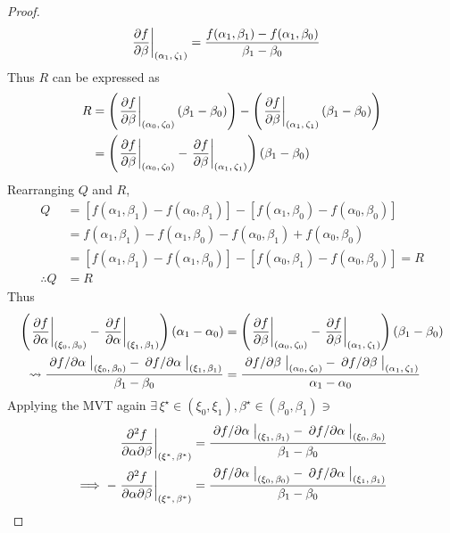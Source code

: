 \begin{lemma}
\begin{proof}
\begin{align*}
			\eval{\pdv{f}{\beta}}_{\point{\alpha_1}{\zeta_1}}&=\frac{f(\alpha_1,\beta_1)-f(\alpha_1,\beta_0)}{\beta_1-\beta_0}
		\end{align*}
		Thus $R$ can be expressed as
		\begin{align*}
			R&=\left(\eval{\pdv{f}{\beta}}_{\point{\alpha_0}{\zeta_0}}\left(\beta_1-\beta_0\right)\right)-\left(\eval{\pdv{f}{\beta}}_{\point{\alpha_1}{\zeta_1}}\left(\beta_1-\beta_0\right)\right)\\
			&=\left(\eval{\pdv{f}{\beta}}_{\point{\alpha_0}{\zeta_0}}-\eval{\pdv{f}{\beta}}_{\point{\alpha_1}{\zeta_1}}\right)\left(\beta_1-\beta_0\right)
		\end{align*}
		Rearranging $Q$ and $R$,
		\begin{align*}
			Q&=[f(\alpha_1,\beta_1)-f(\alpha_0,\beta_1)]-[f(\alpha_1,\beta_0)-f(\alpha_0,\beta_0)]\\
			&=f(\alpha_1,\beta_1)-f(\alpha_1,\beta_0)-f(\alpha_0,\beta_1)+f(\alpha_0,\beta_0)\\
			&=[f(\alpha_1,\beta_1)-f(\alpha_1,\beta_0)]-[f(\alpha_0,\beta_1)-f(\alpha_0,\beta_0)]=R\\
			\therefore Q&=R
		\end{align*}
		Thus
		\begin{align}
			\notag\left(\eval{\pdv{f}{\alpha}}_{\point{\xi_0}{\beta_0}}-\eval{\pdv{f}{\alpha}}_{\point{\xi_1}{\beta_1}}\right)\left(\alpha_1-\alpha_0\right)&=\left(\eval{\pdv{f}{\beta}}_{\point{\alpha_0}{\zeta_0}}-\eval{\pdv{f}{\beta}}_{\point{\alpha_1}{\zeta_1}}\right)\left(\beta_1-\beta_0\right)\\
			\label{proof:SYMMETRY}\leadsto\frac{\eval{\pdv*{f}{\alpha}}_{\point{\xi_0}{\beta_0}}-\eval{\pdv*{f}{\alpha}}_{\point{\xi_1}{\beta_1}}}{\beta_1-\beta_0}&=\frac{\eval{\pdv*{f}{\beta}}_{\point{\alpha_0}{\zeta_0}}-\eval{\pdv*{f}{\beta}}_{\point{\alpha_1}{\zeta_1}}}{\alpha_1-\alpha_0}
		\end{align}
		Applying the MVT again $\exists\,\xi^\star\in(\xi_0,\xi_1),\beta^\star\in(\beta_0,\beta_1)\ni$
		\begin{align*}
			\eval{\pdv{f}{\alpha}{\beta}}_{\point{\xi^\star}{\beta^\star}}&=\frac{\eval{\pdv*{f}{\alpha}}_{\point{\xi_1}{\beta_1}}-\eval{\pdv*{f}{\alpha}}_{\point{\xi_0}{\beta_0}}}{\beta_1-\beta_0}\\
			\implies-\eval{\pdv{f}{\alpha}{\beta}}_{\point{\xi^\star}{\beta^\star}}&=\frac{\eval{\pdv*{f}{\alpha}}_{\point{\xi_0}{\beta_0}}-\eval{\pdv*{f}{\alpha}}_{\point{\xi_1}{\beta_1}}}{\beta_1-\beta_0}
		\end{align*}

\end{proof}
\end{lemma}
